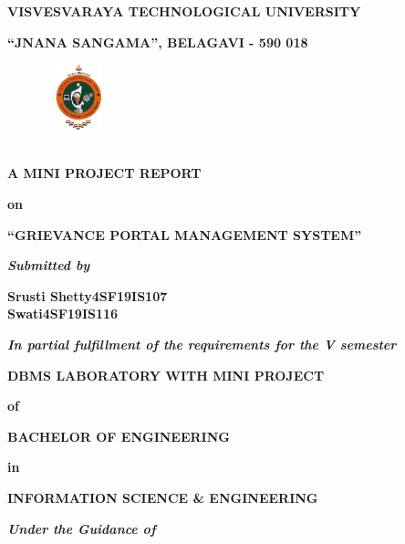 \documentclass[12pt,a4paper]{report}
\begin{document}
\pagestyle{empty}
\begin{center}
{\large \textbf{VISVESVARAYA TECHNOLOGICAL UNIVERSITY}}
\par
\vspace{3pt}
{\large \textbf{``JNANA SANGAMA'', BELAGAVI - 590 018}}
\begin{figure}[hbtp]
\centering
\includegraphics[width=0.80in,height=0.75in]{../fig/vtu}
\end{figure}
\\
\textbf{A MINI PROJECT REPORT}
\par
\textbf{on}
\par
\vspace{3pt}
{\Large \textbf{``GRIEVANCE PORTAL MANAGEMENT SYSTEM''}}
\par
\vspace{8pt}
\textit{\textbf{Submitted by}}
\par
\vspace{6pt}
\textbf{\large Srusti Shetty}\hspace{1.65in}\textbf{\large 4SF19IS107}\\
\textbf{\large  Swati}\hspace{2.4in}\textbf{\large 4SF19IS116}\\
\par
\vspace{3pt}
\textit{\textbf{In partial fulfillment of the requirements for the V semester }}
\par
\vspace{0.5pt}
\Large \textbf{DBMS LABORATORY WITH MINI PROJECT}
\par
\vspace{0.5pt}
\normalsize \centering \textbf{of}
\par
\vspace{0.5pt}
\large \textbf{BACHELOR OF ENGINEERING }
\par
\vspace{0.5pt}
\textbf{in}
\par
\vspace{0.5pt}
\large \textbf{INFORMATION SCIENCE \& ENGINEERING}
\par
\vspace{2pt}
\textit{\textbf{Under the Guidance of}}
\par
\vspace{2pt}

\end{center}
\end{document}
